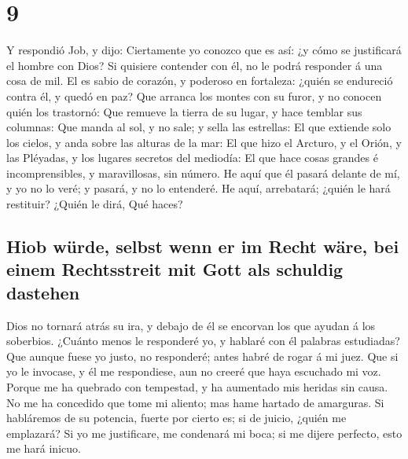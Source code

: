 \hypertarget{section-8}{%
\section{9}\label{section-8}}

 Y respondió Job, y dijo:  Ciertamente yo
conozco que es así: ¿y cómo se justificará el hombre con Dios?
 Si quisiere contender con él, no le podrá responder á una
cosa de mil.  El es sabio de corazón, y poderoso en
fortaleza: ¿quién se endureció contra él, y quedó en paz? 
Que arranca los montes con su furor, y no conocen quién los trastornó:
 Que remueve la tierra de su lugar, y hace temblar sus
columnas:  Que manda al sol, y no sale; y sella las
estrellas:  El que extiende solo los cielos, y anda sobre
las alturas de la mar:  El que hizo el Arcturo, y el Orión,
y las Pléyadas, y los lugares secretos del mediodía:  El
que hace cosas grandes é incomprensibles, y maravillosas, sin número.
 He aquí que él pasará delante de mí, y yo no lo veré; y
pasará, y no lo entenderé.  He aquí, arrebatará; ¿quién le
hará restituir? ¿Quién le dirá, Qué haces?

\hypertarget{hiob-wuxfcrde-selbst-wenn-er-im-recht-wuxe4re-bei-einem-rechtsstreit-mit-gott-als-schuldig-dastehen}{%
\subsection{Hiob würde, selbst wenn er im Recht wäre, bei einem
Rechtsstreit mit Gott als schuldig
dastehen}\label{hiob-wuxfcrde-selbst-wenn-er-im-recht-wuxe4re-bei-einem-rechtsstreit-mit-gott-als-schuldig-dastehen}}

 Dios no tornará atrás su ira, y debajo de él se encorvan
los que ayudan á los soberbios.  ¿Cuánto menos le
responderé yo, y hablaré con él palabras estudiadas?  Que
aunque fuese yo justo, no responderé; antes habré de rogar á mi juez.
 Que si yo le invocase, y él me respondiese, aun no creeré
que haya escuchado mi voz.  Porque me ha quebrado con
tempestad, y ha aumentado mis heridas sin causa.  No me ha
concedido que tome mi aliento; mas hame hartado de amarguras.
 Si habláremos de su potencia, fuerte por cierto es; si de
juicio, ¿quién me emplazará?  Si yo me justificare, me
condenará mi boca; si me dijere perfecto, esto me hará inicuo.

